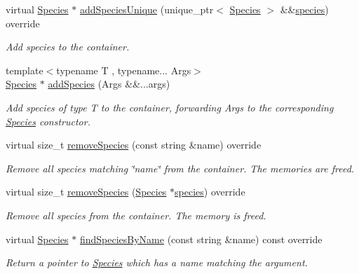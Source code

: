 \begin{DoxyCompactItemize}
virtual \hyperlink{classSpecies}{Species} $\ast$ \hyperlink{classSpeciesPtrContainerVector_a0357974babc855f5449f07988a6c618c}{add\+Species\+Unique} (unique\+\_\+ptr$<$ \hyperlink{classSpecies}{Species} $>$ \&\&\hyperlink{classSpeciesPtrContainerVector_a9ce8b3b4f9a170def9d758d4286e0d3e}{species}) override
\begin{DoxyCompactList}\small\item\em Add species to the container. \end{DoxyCompactList}\item 
{\footnotesize template$<$typename T , typename... Args$>$ }\\\hyperlink{classSpecies}{Species} $\ast$ \hyperlink{classSpeciesPtrContainerVector_a59bdc319752c5ed74bcabc03899f640e}{add\+Species} (Args \&\&...args)
\begin{DoxyCompactList}\small\item\em Add species of type T to the container, forwarding Args to the corresponding \hyperlink{classSpecies}{Species} constructor. \end{DoxyCompactList}\item 
virtual size\+\_\+t \hyperlink{classSpeciesPtrContainerVector_a28489e107644d77ad7d0c6fb9a2ac741}{remove\+Species} (const string \&name) override
\begin{DoxyCompactList}\small\item\em Remove all species matching \char`\"{}name\char`\"{} from the container. The memories are freed. \end{DoxyCompactList}\item 
virtual size\+\_\+t \hyperlink{classSpeciesPtrContainerVector_adb135105c080781ca40782ba267bd611}{remove\+Species} (\hyperlink{classSpecies}{Species} $\ast$\hyperlink{classSpeciesPtrContainerVector_a9ce8b3b4f9a170def9d758d4286e0d3e}{species}) override
\begin{DoxyCompactList}\small\item\em Remove all species from the container. The memory is freed. \end{DoxyCompactList}\item 
virtual \hyperlink{classSpecies}{Species} $\ast$ \hyperlink{classSpeciesPtrContainerVector_a63cd8f629a07f43379cce0a6e4026daf}{find\+Species\+By\+Name} (const string \&name) const override
\begin{DoxyCompactList}\small\item\em Return a pointer to \hyperlink{classSpecies}{Species} which has a name matching the argument. \end{DoxyCompactList}\item 

\end{DoxyCompactItemize}

